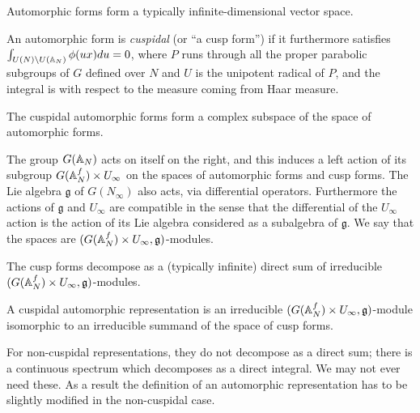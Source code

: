 Automorphic forms form a typically infinite-dimensional vector space. 

\begin{definition}\label{cuspidal_automorphic_form}\notready An automorphic form is \emph{cuspidal} (or ``a cusp form'') if it furthermore satisfies $\int_{U(N)\backslash U(\mathbb{A}_N)}\phi(ux)du=0$, where $P$ runs through all the proper parabolic subgroups of $G$ defined over $N$ and $U$ is the unipotent radical of $P$, and the integral is with respect to the measure coming from Haar measure.
\end{definition}

The cuspidal automorphic forms form a complex subspace of the space of automorphic forms.

\begin{definition}\label{automorphic_form_actions}\notready The group $G(\mathbb{A}_N)$ acts on itself on the right, and this induces a left action of its
    subgroup $G(\mathbb{A}_N^f)\times U_\infty$ on the spaces of automorphic forms and cusp forms. The Lie algebra $\mathfrak{g}$ of $G(N_\infty)$ also acts, via differential operators. Furthermore the actions of $\mathfrak{g}$ and $U_\infty$ are compatible in the sense that the differential of the $U_\infty$ action is the action of its Lie algebra considered as a subalgebra of $\mathfrak{g}$. We say that the spaces are $(G(\mathbb{A}_N^f)\times U_\infty,\mathfrak{g})$-modules.
\end{definition}

\begin{theorem}\label{cuspidal_automorphic_form_decomposition} The cusp forms decompose as a (typically infinite) direct sum of irreducible $(G(\mathbb{A}_N^f)\times U_\infty,\mathfrak{g})$-modules.
\end{theorem}
\begin{definition}\label{cuspidal_automorphic_representation}\notready A cuspidal automorphic representation is an irreducible $(G(\mathbb{A}_N^f)\times U_\infty,\mathfrak{g})$-module isomorphic to an irreducible summand of the space of cusp forms.
\end{definition}

For non-cuspidal representations, they do not decompose as a direct sum; there is a continuous spectrum which decomposes as a direct integral. We may not ever need these. As a result the definition of an automorphic representation has to be slightly modified in the non-cuspidal case.

